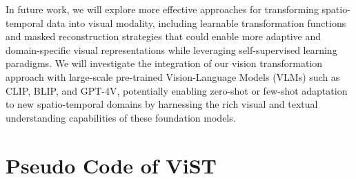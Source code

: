 In future work, we will explore more effective approaches for transforming spatio-temporal data into visual modality, including learnable transformation functions and masked reconstruction strategies that could enable more adaptive and domain-specific visual representations while leveraging self-supervised learning paradigms. We will investigate the integration of our vision transformation approach with large-scale pre-trained Vision-Language Models (VLMs) such as CLIP, BLIP, and GPT-4V, potentially enabling zero-shot or few-shot adaptation to new spatio-temporal domains by harnessing the rich visual and textual understanding capabilities of these foundation models.

\section{Pseudo Code of ViST}
\label{appx:pseudo}

